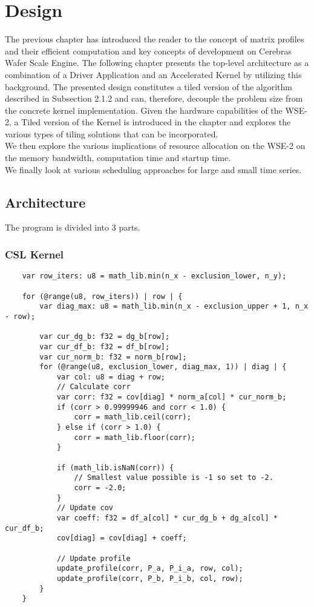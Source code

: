 \chapter{Design}\label{chapter:design}

The previous chapter has introduced the reader to the concept of matrix profiles and
their efficient computation and key concepts of development on Cerebras Wafer Scale Engine. The following chapter presents the top-level architecture as a combination
of a Driver Application and an Accelerated Kernel by utilizing this background.
The presented design constitutes a tiled version of the algorithm described in
Subsection 2.1.2 and can, therefore, decouple the problem size from the concrete kernel
implementation. Given the hardware capabilities of the WSE-2, a Tiled version of the Kernel is introduced in the chapter and explores the various types of tiling solutions that can be incorporated.\\

We then explore the various implications of resource allocation on the WSE-2 on the memory bandwidth, computation time and startup time.\\

We finally look at various scheduling approaches for large and small time series.


\section{Architecture}

The program is divided into 3 parts.
\subsection{CSL Kernel}

\begin{lstlisting}
    var row_iters: u8 = math_lib.min(n_x - exclusion_lower, n_y);

	for (@range(u8, row_iters)) | row | {
		var diag_max: u8 = math_lib.min(n_x - exclusion_upper + 1, n_x - row);

		var cur_dg_b: f32 = dg_b[row];
		var cur_df_b: f32 = df_b[row];
		var cur_norm_b: f32 = norm_b[row];
		for (@range(u8, exclusion_lower, diag_max, 1)) | diag | {
			var col: u8 = diag + row;
			// Calculate corr
			var corr: f32 = cov[diag] * norm_a[col] * cur_norm_b;
			if (corr > 0.99999946 and corr < 1.0) {
				corr = math_lib.ceil(corr);
			} else if (corr > 1.0) {
				corr = math_lib.floor(corr);
			}

			if (math_lib.isNaN(corr)) {
				// Smallest value possible is -1 so set to -2.
				corr = -2.0;
			}
			// Update cov
			var coeff: f32 = df_a[col] * cur_dg_b + dg_a[col] * cur_df_b;
			cov[diag] = cov[diag] + coeff;

			// Update profile
			update_profile(corr, P_a, P_i_a, row, col);
			update_profile(corr, P_b, P_i_b, col, row);
		}
	}
\end{lstlisting}

